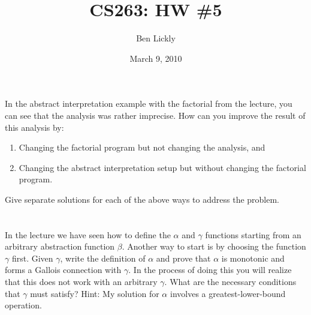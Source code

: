 \documentclass{article}
\title{CS263: HW \#5}
\author{Ben Lickly}
\date{March 9, 2010}
\newcommand{\problem}[1]
{\subsubsection*{} %
\vspace{-16pt} \section{} \vspace{-22pt} \qquad
#1%
\bigskip \bigskip
}
\begin{document}
\maketitle

\problem{In the abstract interpretation example with the factorial from
the lecture, you can see that the analysis was rather imprecise. How can you
improve the result of this analysis by:
\begin{enumerate}
  \item Changing the factorial program but not changing the analysis, and
  \item Changing the abstract interpretation setup but without changing the
factorial program.
\end{enumerate}
Give separate solutions for each of the above ways to address the problem.
}

\problem{In the lecture we have seen how to define the $\alpha$ and $\gamma$
functions starting from an arbitrary abstraction function $\beta$. Another way to
start is by choosing the function $\gamma$ first. Given $\gamma$, write the
definition of $\alpha$ and prove that $\alpha$ is monotonic and forms a Gallois
connection with $\gamma$. In the process of doing this you will realize that this
does not work with an arbitrary $\gamma$. What are the necessary conditions that
$\gamma$ must satisfy? Hint: My solution for $\alpha$ involves a
greatest-lower-bound operation.
}
\end{document}
